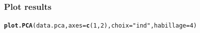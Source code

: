 \documentclass[aspectratio=169]{beamer}\usepackage[]{graphicx}\usepackage[]{xcolor}
\makeatletter
\newcommand{\hlnum}[1]{\textcolor[rgb]{0.686,0.059,0.569}{#1}}%
\newcommand{\hlsng}[1]{\textcolor[rgb]{0.192,0.494,0.8}{#1}}%
\newcommand{\hldef}[1]{\textcolor[rgb]{0.345,0.345,0.345}{#1}}%
\newcommand{\hlkwc}[1]{\textcolor[rgb]{0.333,0.667,0.333}{#1}}%
\newcommand{\hlkwd}[1]{\textcolor[rgb]{0.737,0.353,0.396}{\textbf{#1}}}%
\newenvironment{kframe}{%
 \def\at@end@of@kframe{}%
 \ifinner\ifhmode%
  \def\at@end@of@kframe{\end{minipage}}%
  \begin{minipage}{\columnwidth}%
 \fi\fi%
 \def\FrameCommand##1{\hskip\@totalleftmargin \hskip-\fboxsep
 \colorbox{shadecolor}{##1}\hskip-\fboxsep
     \hskip-\linewidth \hskip-\@totalleftmargin \hskip\columnwidth}%
 \MakeFramed {\advance\hsize-\width
   \@totalleftmargin\z@ \linewidth\hsize
   \@setminipage}}%
 {\par\unskip\endMakeFramed%
 \at@end@of@kframe}
\newenvironment{knitrout}{}{} %
\makeatother
\begin{document}
% 
% 
% 
% 
% 

\begin{frame}[fragile]\frametitle{Plot results}
\begin{knitrout}
\color{fgcolor}\begin{kframe}
\begin{alltt}
\hlkwd{plot.PCA}\hldef{(data.pca,} \hlkwc{axes} \hldef{=} \hlkwd{c}\hldef{(}\hlnum{1}\hldef{,}\hlnum{2}\hldef{),} \hlkwc{choix} \hldef{=} \hlsng{"ind"}\hldef{,} \hlkwc{habillage} \hldef{=} \hlnum{4}\hldef{)}
\end{alltt}
\end{kframe}
\end{knitrout}
\end{frame}


% 


% 
% 
% 
% 
% 
\end{document}
